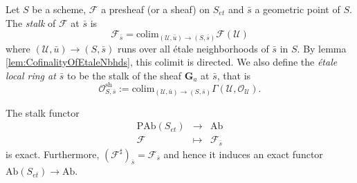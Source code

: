 \begin{definition}
\label{defi:EtaleLocalRings}
Let $S$ be a scheme, $\mathcal{F}$ a presheaf (or a sheaf) on $S_{et}$ and 
$\bar s$ a geometric point of $S$. The {\it stalk} of $\mathcal{F}$ at $\bar 
s$ is  
$$
\mathcal{F}_{\bar s} = \text{colim}_{(\mathcal{U}, \bar u) \to (S,\bar s)} 
\mathcal{F}(\mathcal{U}) 
$$
where $(\mathcal{U}, \bar u) \to (S,\bar s)$ runs over all \'etale 
neighborhoods of $\bar s$ in $S$. By lemma \ref{lem:CofinalityOfEtaleNbhds}, 
this colimit is directed. We also define the {\it \'etale local ring at $\bar 
s$} to be the stalk of the sheaf $\mathbf{G}_a$ at $\bar s$, that is
$$
\mathcal{O}_{S, \bar{s}}^\text{sh} := \text{colim}_{(\mathcal{U}, \bar u) \to 
(S,\bar s)} \Gamma(\mathcal{U}, \mathcal{O}_\mathcal{U}).
$$
\end{definition}

\begin{lemma}
The stalk functor 
$$
\begin{matrix}
\text{PAb}(S_{et}) & \longrightarrow & \text{Ab}\\ 
\mathcal{F} & \longmapsto & \mathcal{F}_{\bar s}
\end{matrix}
$$ 
is exact. Furthermore, $\left(\mathcal{F}^\sharp\right)_{\bar s} = 
\mathcal{F}_{\bar s}$ and hence it induces an exact functor 
$\text{Ab}(S_{et})\to \text{Ab}$.
\end{lemma}

